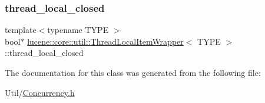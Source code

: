 \mbox{\label{classlucene_1_1core_1_1util_1_1ThreadLocalItemWrapper_a5e0fecb4397f3d5e19a03d07adde08b6}} 
\subsubsection{\texorpdfstring{thread\+\_\+local\+\_\+closed}{thread\_local\_closed}}
{\footnotesize\ttfamily template$<$typename T\+Y\+PE $>$ \\
bool$\ast$ \mbox{\hyperlink{classlucene_1_1core_1_1util_1_1ThreadLocalItemWrapper}{lucene\+::core\+::util\+::\+Thread\+Local\+Item\+Wrapper}}$<$ T\+Y\+PE $>$\+::thread\+\_\+local\+\_\+closed\hspace{0.3cm}{\ttfamily [private]}}



The documentation for this class was generated from the following file\+:\begin{DoxyCompactItemize}
\item 
Util/\mbox{\hyperlink{Concurrency_8h}{Concurrency.\+h}}\end{DoxyCompactItemize}
